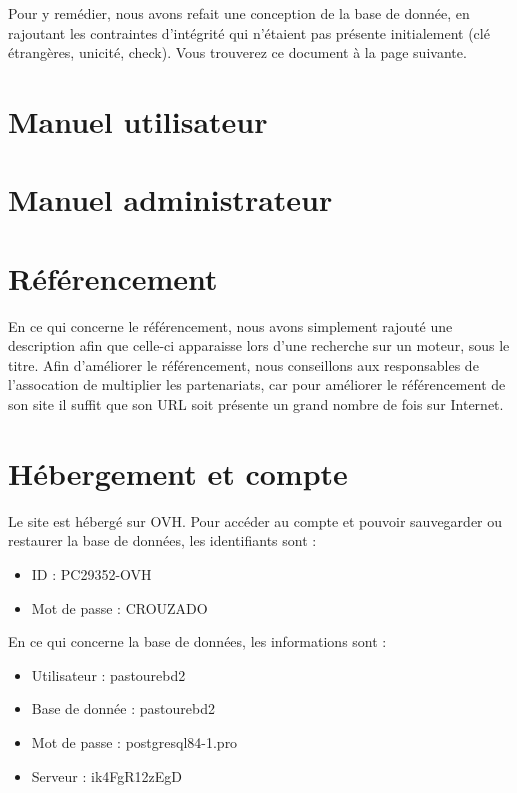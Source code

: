 \documentclass[11pt]{report}
\begin{document}
\par Pour y remédier, nous avons refait une conception de la base de donnée, en
rajoutant les contraintes d'intégrité qui n'étaient pas présente initialement
(clé étrangères, unicité, check). Vous trouverez ce document à la page suivante.


\section{Manuel utilisateur}
\section{Manuel administrateur}
\section{Référencement}
En ce qui concerne le référencement, nous avons simplement rajouté une
description afin que celle-ci apparaisse lors d'une recherche sur un moteur,
sous le titre. Afin d'améliorer le référencement, nous conseillons aux
responsables de l'assocation de multiplier les partenariats, car pour améliorer
le référencement de son site il suffit que son URL soit présente un grand nombre
de fois sur Internet.

\section{Hébergement et compte}
Le site est hébergé sur OVH. Pour accéder au compte et pouvoir sauvegarder ou
restaurer la base de données, les identifiants sont : \\
\begin{itemize}
  \item ID : PC29352-OVH
  \item Mot de passe : CROUZADO \\
\end{itemize}

\par En ce qui concerne la base de données, les informations sont : \\
\begin{itemize}
  \item Utilisateur : pastourebd2
  \item Base de donnée : pastourebd2
  \item Mot de passe :  postgresql84-1.pro
  \item Serveur : ik4FgR12zEgD \\
\end{itemize}
\end{document}
